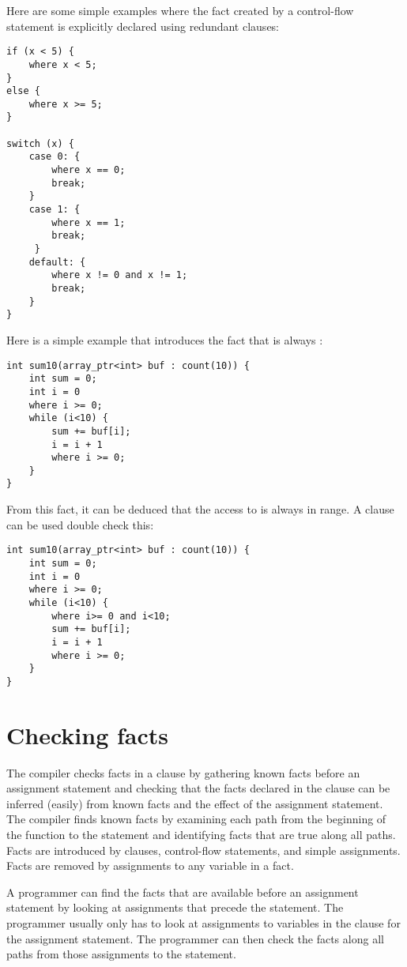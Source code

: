 Here are some simple examples where the fact created by a control-flow
statement is explicitly declared using redundant  clauses:

\begin{lstlisting}
if (x < 5) {
    where x < 5;
}
else {
    where x >= 5;
} 

switch (x) {
    case 0: {
        where x == 0;
        break;
    }
    case 1: {
        where x == 1;
        break;
     }   
    default: {
        where x != 0 and x != 1;
        break;
    }
}
\end{lstlisting}

Here is a simple example that introduces the fact that  is always
:

\begin{lstlisting}
int sum10(array_ptr<int> buf : count(10)) {
    int sum = 0;
    int i = 0
    where i >= 0;
    while (i<10) {
        sum += buf[i];
        i = i + 1
        where i >= 0;
    }
}
\end{lstlisting}

From this fact, it can be deduced that the access to  is always in
range. A  clause can be used double check this:

\begin{lstlisting}
int sum10(array_ptr<int> buf : count(10)) {
    int sum = 0;
    int i = 0
    where i >= 0;
    while (i<10) {
        where i>= 0 and i<10;
        sum += buf[i];
        i = i + 1
        where i >= 0;
    }
}
\end{lstlisting}

\section{Checking facts}

The compiler checks facts in a  clause by gathering known
facts before an assignment statement and checking that the facts
declared in the  clause can be inferred (easily) from
known facts and the effect of the assignment statement. The compiler
finds known facts by examining each path from the beginning of the
function to the statement and identifying facts that are true along all
paths. Facts are introduced by  clauses, control-flow
statements, and simple assignments. Facts are removed by assignments to any
variable in a fact.

A programmer can find the facts that are available before an assignment
statement by looking at assignments that precede the statement. The
programmer usually only has to look at assignments to variables in the
 clause for the assignment statement. The programmer can then check
the facts along all paths from those assignments to the statement.

